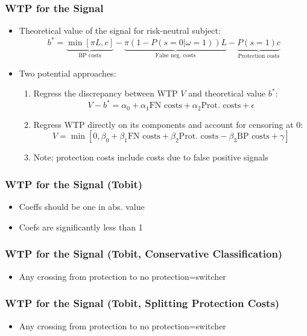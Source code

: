 \documentclass[11pt,hyperref={bookmarks=false}]{beamer}
\begin{document}
\begin{frame}
\frametitle{WTP for the Signal}
\begin{itemize}
\item Theoretical value of the signal for risk-neutral subject:
$$b^*=\underbrace{\min[\pi L,c]}_{\text{BP costs}}-\underbrace{\pi(1-P(s=0|\omega=1))L}_{\text{False neg. costs}}-\underbrace{P(s=1)c}_{\text{Protection costs}}$$
\item Two potential approaches:
\begin{enumerate}
\item Regress the discrepancy between WTP $V$ and theoretical value $b^*$:
$$V-b^*=\alpha_0+\alpha_1\text{FN costs}+\alpha_2 \text{Prot. costs}+\epsilon$$
\item Regress WTP directly on its components and account for censoring at 0:
$$V=\min[0,\beta_0+\beta_1\text{FN costs}+\beta_2 \text{Prot. costs}-\beta_3\text{BP costs}+\gamma]$$
\item Note: protection costs include costs due to false positive signals
\end{enumerate}
\end{itemize}

\end{frame}


\begin{frame}
\frametitle{WTP for the Signal (Tobit)}
\begin{itemize}
\item Coeffs should be one in abs. value
\item Coefs are significantly less than 1
\end{itemize}
\footnotesize

\normalsize
\end{frame}


\begin{frame}
\frametitle{WTP for the Signal (Tobit, Conservative Classification)}
\begin{itemize}
\item Any crossing from protection to no protection=switcher
\end{itemize}
\footnotesize

\normalsize
\end{frame}


\begin{frame}
\frametitle{WTP for the Signal (Tobit, Splitting Protection Costs)}
\begin{itemize}
\item Any crossing from protection to no protection=switcher
\end{itemize}
\footnotesize

\normalsize
\end{frame}
\end{document}
